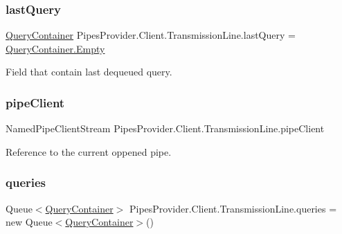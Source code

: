 \subsubsection{\texorpdfstring{last\+Query}{lastQuery}}
{\footnotesize\ttfamily \mbox{\hyperlink{struct_pipes_provider_1_1_client_1_1_query_container}{Query\+Container}} Pipes\+Provider.\+Client.\+Transmission\+Line.\+last\+Query = \mbox{\hyperlink{struct_pipes_provider_1_1_client_1_1_query_container_a0e1f91d0a990824b56170c3da5e5919c}{Query\+Container.\+Empty}}\hspace{0.3cm}{\ttfamily [protected]}}



Field that contain last dequeued query. 

\mbox{\label{class_pipes_provider_1_1_client_1_1_transmission_line_a617db258fff1a28c80ff7d6241e8372e}} 
\subsubsection{\texorpdfstring{pipe\+Client}{pipeClient}}
{\footnotesize\ttfamily Named\+Pipe\+Client\+Stream Pipes\+Provider.\+Client.\+Transmission\+Line.\+pipe\+Client}



Reference to the current oppened pipe. 

\mbox{\label{class_pipes_provider_1_1_client_1_1_transmission_line_af110134a03e1e046911970fff4774600}} 
\subsubsection{\texorpdfstring{queries}{queries}}
{\footnotesize\ttfamily Queue$<$\mbox{\hyperlink{struct_pipes_provider_1_1_client_1_1_query_container}{Query\+Container}}$>$ Pipes\+Provider.\+Client.\+Transmission\+Line.\+queries = new Queue$<$\mbox{\hyperlink{struct_pipes_provider_1_1_client_1_1_query_container}{Query\+Container}}$>$()\hspace{0.3cm}{\ttfamily [protected]}}



